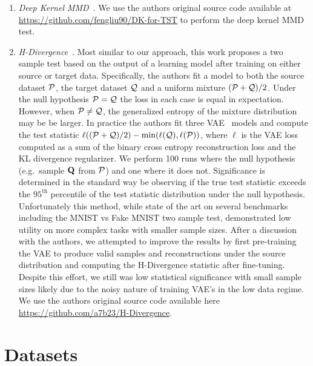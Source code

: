 \begin{enumerate}
    \item \textit{Deep Kernel MMD}~\citep{liu2020learning}.
    We use the authors original source code available at \url{https://github.com/fengliu90/DK-for-TST} to perform the deep kernel MMD test.
    \item \textit{H-Divergence}~\citep{zhao2022comparing}.
    Most similar to our approach, this work proposes a two sample test based on the output of a learning model after training on either source or target data.
    Specifically, the authors fit a model to both the source dataset $\mathcal{P}$, the target dataset $\mathcal{Q}$ and a uniform mixture $(\mathcal{P}+\mathcal{Q})/2$.
    Under the null hypothesis $\mathcal{P}=\mathcal{Q}$ the loss in each case is equal in expectation.
    However, when $\mathcal{P} \neq \mathcal{Q}$, the generalized entropy of the mixture distribution may be be larger.
    In practice the authors fit three VAE~\citep{DBLP:journals/corr/KingmaW13} models and compute the test statistic $\ell((\mathcal{P}+\mathcal{Q})/2) -\min(\ell(\mathcal{Q}), \ell(\mathcal{P}))$, where $\ell$ is the VAE loss
    computed as a sum of the binary cross entropy reconstruction loss and the KL divergence regularizer.
    We perform 100 runs where the null hypothesis (e.g.\ sample $\mathbf{Q}$ from $\mathcal{P}$) and one where it does not.
    Significance is determined in the standard way be observing if the true test statistic exceeds the $95^\text{th}$ percentile of the test statistic distribution under the null hypothesis.
    Unfortunately this method, while state of the art on several benchmarks including the MNIST vs Fake MNIST two sample test, demonstrated low utility on more complex tasks with smaller sample sizes.
    After a discussion with the authors, we attempted to improve the results by first pre-training the VAE to produce valid samples and reconstructions under the source distribution and computing the H-Divergence statistic
    after fine-tuning.
    Despite this effort, we still was low statistical significance with small sample sizes likely due to the noisy nature of training VAE's in the low data regime.
    We use the authors original source code available here \url{https://github.com/a7b23/H-Divergence}.
\end{enumerate}


\section{Datasets}
\label{sec:data}

